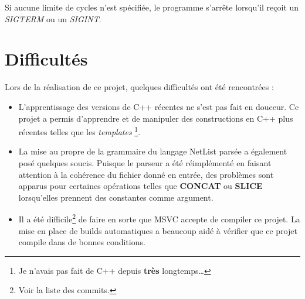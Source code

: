 \documentclass[french, 12pt]{article}
\begin{document}
Si aucune limite de cycles n'est spécifiée, le programme s'arrête lorsqu'il
reçoit un \textit{SIGTERM} ou un \textit{SIGINT}.


\section{Difficultés}

Lors de la réalisation de ce projet, quelques difficultés ont été rencontrées :

\begin{itemize}
      \item L'apprentissage des versions de C++ récentes ne s'est pas
            fait en douceur. Ce projet a permis d'apprendre et de manipuler des
            constructions en C++ plus récentes telles que les \textit{templates}%
            \footnote{Je n'avais pas fait de C++ depuis \textbf{très} longtemps\dots}.
      \item La mise au propre de la grammaire du langage NetList parsée a
            également posé quelques soucis. Puisque le parseur a été
            réimplémenté en faisant attention à la cohérence du fichier donné en
            entrée, des problèmes sont apparus pour certaines opérations telles que
            \textbf{CONCAT} ou \textbf{SLICE} lorsqu'elles prennent des
            constantes comme argument.
      \item Il a été difficile\footnote{Voir la liste des commits.} de faire en
            sorte que MSVC accepte de compiler ce projet.
            La mise en place de builds automatiques a beaucoup aidé à
            vérifier que ce projet compile dans de bonnes conditions.
\end{itemize}
\end{document}
